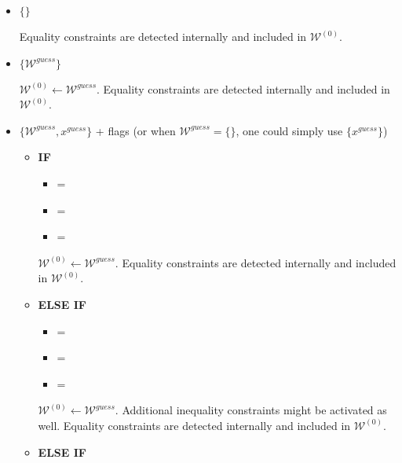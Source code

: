 \documentclass[12pt,a4paper]{article}
\begin{document}
\begin{itemize}
\item {\color{blue}$\{\}$}

  Equality constraints are detected internally and included in $\mathcal{W}^{(0)}$.

\item {\color{blue}$\{\mathcal{W}^{\mathit{guess}}\}$}

  $\mathcal{W}^{(0)} \leftarrow \mathcal{W}^{\mathit{guess}}$. Equality constraints are detected
  internally and included in $\mathcal{W}^{(0)}$.

\item {\color{blue}$\{\mathcal{W}^{\mathit{guess}}, x^{\mathit{guess}}\}$} + flags (or when
  $\mathcal{W}^{\mathit{guess}} = \{\}$, one could simply use {\color{blue}$\{x^{\mathit{guess}}\}$})

  \begin{itemize}
  \item[\ding{237}] {\bf IF}

    \begin{itemize}
    \item {} = 
    \item {} = 
    \item {} = 
    \end{itemize}
    $\mathcal{W}^{(0)} \leftarrow \mathcal{W}^{\mathit{guess}}$. Equality constraints are detected
    internally and included in $\mathcal{W}^{(0)}$.

  \item[\ding{237}] {\bf ELSE IF}

    \begin{itemize}
    \item {} = 
    \item {\color{blue} = }
    \item {} = 
    \end{itemize}
    $\mathcal{W}^{(0)} \leftarrow \mathcal{W}^{\mathit{guess}}$. Additional inequality constraints
    might be activated as well. Equality constraints are detected internally and included in
    $\mathcal{W}^{(0)}$.

  \item[\ding{237}] {\bf ELSE IF}


\end{itemize}
\end{itemize}
\end{document}
